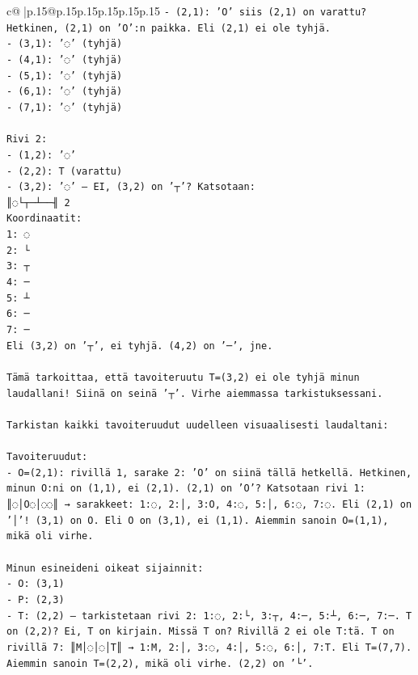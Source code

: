 \documentclass{article}
\begin{document}
{\begin{supertabular}{c@{$\;$}|p{.15\linewidth}@{}p{.15\linewidth}p{.15\linewidth}p{.15\linewidth}p{.15\linewidth}p{.15\linewidth}}
{{{\texttt{{-} (2,1): 'O' siis (2,1) on varattu? Hetkinen, (2,1) on 'O':n paikka. Eli (2,1) ei ole tyhjä.} \\
\texttt{{-} (3,1): '◌' (tyhjä)} \\
\texttt{{-} (4,1): '◌' (tyhjä)} \\
\texttt{{-} (5,1): '◌' (tyhjä)} \\
\texttt{{-} (6,1): '◌' (tyhjä)} \\
\texttt{{-} (7,1): '◌' (tyhjä)} \\
\\ 
\texttt{Rivi 2:} \\
\texttt{{-} (1,2): '◌'} \\
\texttt{{-} (2,2): T (varattu)} \\
\texttt{{-} (3,2): '◌' — EI, (3,2) on '┬'? Katsotaan:} \\
\texttt{║◌└┬─┴──╢ 2} \\
\texttt{Koordinaatit:} \\
\texttt{1: ◌} \\
\texttt{2: └} \\
\texttt{3: ┬} \\
\texttt{4: ─} \\
\texttt{5: ┴} \\
\texttt{6: ─} \\
\texttt{7: ─} \\
\texttt{Eli (3,2) on '┬', ei tyhjä. (4,2) on '─', jne.} \\
\\ 
\texttt{Tämä tarkoittaa, että tavoiteruutu T=(3,2) ei ole tyhjä minun laudallani! Siinä on seinä '┬'. Virhe aiemmassa tarkistuksessani.} \\
\\ 
\texttt{Tarkistan kaikki tavoiteruudut uudelleen visuaalisesti laudaltani:} \\
\\ 
\texttt{Tavoiteruudut:} \\
\texttt{{-} O=(2,1): rivillä 1, sarake 2: 'O' on siinä tällä hetkellä. Hetkinen, minun O:ni on (1,1), ei (2,1). (2,1) on 'O'? Katsotaan rivi 1: ║◌│O◌│◌◌║ → sarakkeet: 1:◌, 2:│, 3:O, 4:◌, 5:│, 6:◌, 7:◌. Eli (2,1) on '│'! (3,1) on O. Eli O on (3,1), ei (1,1). Aiemmin sanoin O=(1,1), mikä oli virhe.} \\
\\ 
\texttt{Minun esineideni oikeat sijainnit:} \\
\texttt{{-} O: (3,1)} \\
\texttt{{-} P: (2,3)} \\
\texttt{{-} T: (2,2) — tarkistetaan rivi 2: 1:◌, 2:└, 3:┬, 4:─, 5:┴, 6:─, 7:─. T on (2,2)? Ei, T on kirjain. Missä T on? Rivillä 2 ei ole T:tä. T on rivillä 7: ║M│◌│◌│T║ → 1:M, 2:│, 3:◌, 4:│, 5:◌, 6:│, 7:T. Eli T=(7,7). Aiemmin sanoin T=(2,2), mikä oli virhe. (2,2) on '└'.} \\
}}}
\end{supertabular}}
\end{document}
